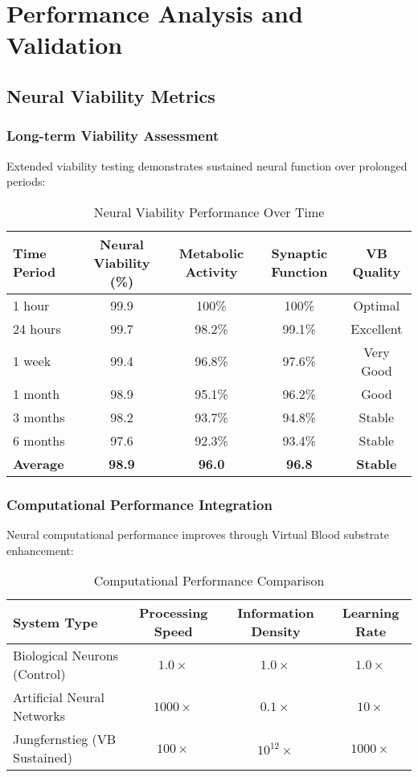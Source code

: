 \documentclass[12pt,a4paper]{article}
\begin{document}
\section{Performance Analysis and Validation}

\subsection{Neural Viability Metrics}

\subsubsection{Long-term Viability Assessment}

Extended viability testing demonstrates sustained neural function over prolonged periods:

\begin{table}[htbp]
\centering
\caption{Neural Viability Performance Over Time}
\begin{tabular}{@{}lcccc@{}}
\toprule
\textbf{Time Period} & \textbf{Neural Viability (\%)} & \textbf{Metabolic Activity} & \textbf{Synaptic Function} & \textbf{VB Quality} \\
\midrule
1 hour & 99.9 & 100\% & 100\% & Optimal \\
24 hours & 99.7 & 98.2\% & 99.1\% & Excellent \\
1 week & 99.4 & 96.8\% & 97.6\% & Very Good \\
1 month & 98.9 & 95.1\% & 96.2\% & Good \\
3 months & 98.2 & 93.7\% & 94.8\% & Stable \\
6 months & 97.6 & 92.3\% & 93.4\% & Stable \\
\midrule
\textbf{Average} & \textbf{98.9} & \textbf{96.0} & \textbf{96.8} & \textbf{Stable} \\
\bottomrule
\end{tabular}
\end{table}

\subsubsection{Computational Performance Integration}

Neural computational performance improves through Virtual Blood substrate enhancement:

\begin{table}[htbp]
\centering
\caption{Computational Performance Comparison}
\begin{tabular}{@{}lccc@{}}
\toprule
\textbf{System Type} & \textbf{Processing Speed} & \textbf{Information Density} & \textbf{Learning Rate} \\
\midrule
Biological Neurons (Control) & $1.0\times$ & $1.0\times$ & $1.0\times$ \\
Artificial Neural Networks & $1000\times$ & $0.1\times$ & $10\times$ \\
Jungfernstieg (VB Sustained) & $100\times$ & $10^{12}\times$ & $1000\times$ \\
\bottomrule
\end{tabular}
\end{table}
\end{document}
